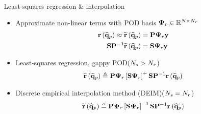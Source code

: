 \documentclass[]{beamer}
\begin{document}
\begin{frame}{Least-squares regression \& interpolation}
    \begin{itemize}
		\item Approximate non-linear terms with POD basis $\deimBasisRes \in \mathbb{R}^{\numDOF \times \numResModes}$
		\begin{align*}
			\resFunc{\primVecCoef} \approx \resApproxFunc{\primVecCoef} &= \consScale \deimBasisRes \dummyVec \\
			\sampMat \consScaleInv \resApproxFunc{\primVecCoef} &= \sampMat \deimBasisRes \dummyVec
		\end{align*}
		\item Least-squares regression, gappy POD\footnotemark[7] ($N_s > N_r$)
		\begin{equation*}
			\resApproxFunc{\primVecCoef} \triangleq \consScale \deimBasisRes \left[ \sampMat \deimBasisRes \right]^{+} \sampMat \consScaleInv \resFunc{\primVecCoef}
		\end{equation*}
		\item Discrete empirical interpolation method (DEIM)\footnotemark[8] ($N_s = N_r$)
		\begin{equation*}
			\resApproxFunc{\primVecCoef} \triangleq \consScale \deimBasisRes \left[ \sampMat \deimBasisRes \right]^{-1} \sampMat \consScaleInv \resFunc{\primVecCoef}
		\end{equation*}
	\end{itemize}
\end{frame}
\end{document}
